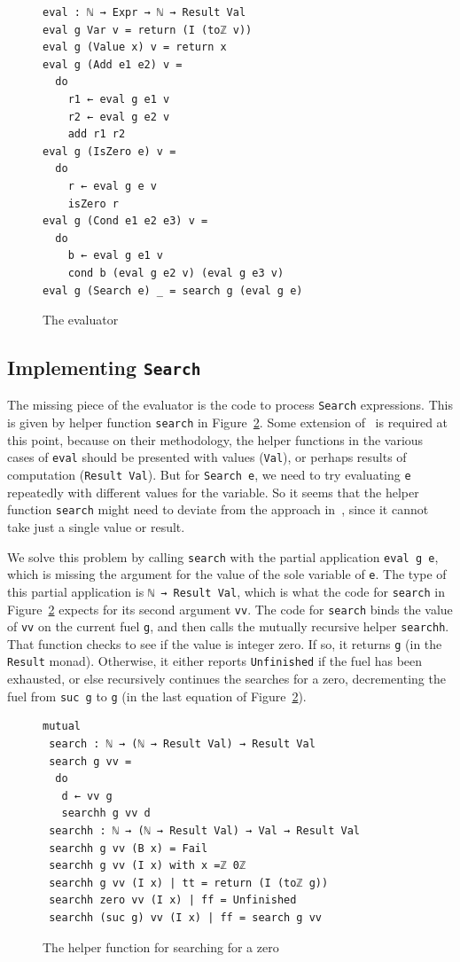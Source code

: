 \documentclass[acmsmall,screen,review]{acmart}
\begin{document}
\begin{figure}
\begin{verbatim}
eval : ℕ → Expr → ℕ → Result Val
eval g Var v = return (I (toℤ v))
eval g (Value x) v = return x
eval g (Add e1 e2) v =
  do
    r1 ← eval g e1 v
    r2 ← eval g e2 v
    add r1 r2
eval g (IsZero e) v =
  do
    r ← eval g e v
    isZero r
eval g (Cond e1 e2 e3) v =
  do
    b ← eval g e1 v
    cond b (eval g e2 v) (eval g e3 v)
eval g (Search e) _ = search g (eval g e)
\end{verbatim}
\caption{The evaluator}
\label{fig:eval}
\end{figure}

\subsection{Implementing \texttt{Search}}

The missing piece of the evaluator is the code to process \verb|Search| expressions.  This
is given by helper function \verb|search| in Figure~\ref{fig:search}.  Some extension of~\citet{garby+25}
is required at this point, because on their methodology, the helper functions in the various cases
of \verb|eval| should be presented with values (\verb|Val|), or perhaps results of computation (\verb|Result Val|).
But for \verb|Search e|, we need to try evaluating \verb|e| repeatedly with different values for the variable.
So it seems that the helper function \verb|search| might need to deviate from the approach in~\citet{garby+25},
since it cannot take just a single value or result.

We solve this problem by calling \verb|search| with the partial
application \verb|eval g e|, which is missing the argument for the
value of the sole variable of \verb|e|.  The type of this partial
application is \verb|ℕ → Result Val|, which is what the code for
\verb|search| in Figure~\ref{fig:search} expects for its second
argument \verb|vv|.  The code for \verb|search| binds the value of
\verb|vv| on the current fuel \verb|g|, and then calls the
mutually recursive helper \verb|searchh|.  That function
checks to see if the value is integer zero.  If so, it returns
\verb|g| (in the \verb|Result| monad).  Otherwise, it either reports
\verb|Unfinished| if the fuel has been exhausted, or else recursively
continues the searches for a zero, decrementing the fuel from
\verb|suc g| to \verb|g| (in the last equation of
Figure~\ref{fig:search}).

\begin{figure}
\begin{verbatim}
mutual 
 search : ℕ → (ℕ → Result Val) → Result Val
 search g vv =
  do
   d ← vv g
   searchh g vv d 
 searchh : ℕ → (ℕ → Result Val) → Val → Result Val
 searchh g vv (B x) = Fail
 searchh g vv (I x) with x =ℤ 0ℤ
 searchh g vv (I x) | tt = return (I (toℤ g))
 searchh zero vv (I x) | ff = Unfinished
 searchh (suc g) vv (I x) | ff = search g vv
\end{verbatim}
\caption{The helper function for searching for a zero}
\label{fig:search}
\end{figure}
\end{document}
